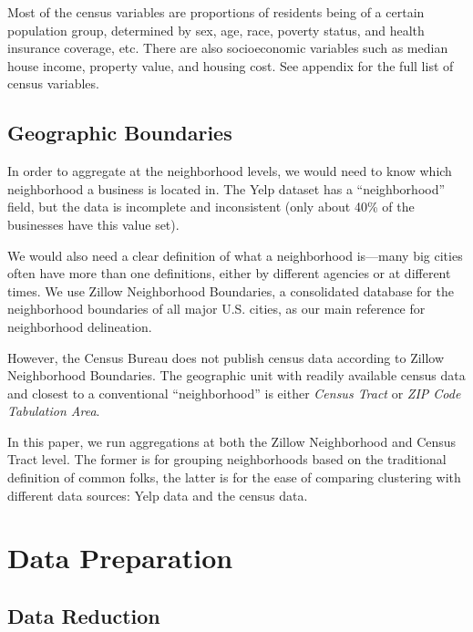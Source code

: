 \documentclass[compsoc]{IEEEtran}
\begin{document}
Most of the census variables are proportions of residents being of a certain population group, determined by sex, age, race, poverty status, and health insurance coverage, etc. There are also socioeconomic variables such as median house income, property value, and housing cost. See appendix for the full list of census variables.

\subsection{Geographic Boundaries}

In order to aggregate at the neighborhood levels, we would need to know which neighborhood a business is located in. The Yelp dataset has a ``neighborhood'' field, but the data is incomplete and inconsistent (only about 40\% of the businesses have this value set).

We would also need a clear definition of what a neighborhood is---many big cities often have more than one definitions, either by different agencies or at different times. We use Zillow Neighborhood Boundaries, a consolidated database for the neighborhood boundaries of all major U.S. cities, as our main reference for neighborhood delineation.

However, the Census Bureau does not publish census data according to  Zillow Neighborhood Boundaries. The geographic unit with readily available census data and closest to a conventional ``neighborhood'' is either \textit{Census Tract} or \textit{ZIP Code Tabulation Area}.  %

In this paper, we run aggregations at both the Zillow Neighborhood and Census Tract level. The former is for grouping neighborhoods based on the traditional definition of common folks, the latter is for the ease of comparing clustering with different data sources: Yelp data and the census data.

\section{Data Preparation}

\subsection{Data Reduction}
\end{document}
